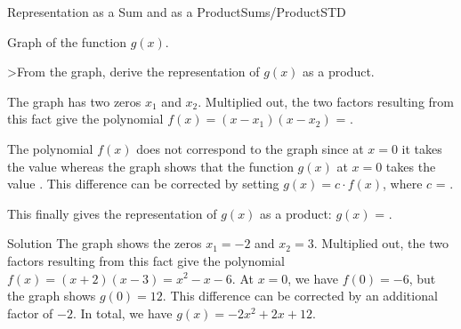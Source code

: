 \begin{MXContent}{Representation as a Sum and as a Product}{Sums/Product}{STD}
\begin{MExercise}
\begin{center}
\par
Graph of the function $g(x)$.
\end{center}
>From the graph, derive the representation of $g(x)$ as a product.

\begin{MExerciseItems}
\item{The graph has two zeros $x_1$ and $x_2$. Multiplied out, the two factors resulting from this fact give the polynomial 
$f(x)=(x-x_1)(x-x_2)$ = .}
\item{The polynomial $f(x)$ does not correspond to the graph since at $x=0$ it takes the value 
 whereas the graph shows that the function $g(x)$ at $x=0$ takes the value 
. This difference can be corrected by setting $g(x)=c\cdot f(x)$, where 
$c$ = .}
\item{This finally gives the representation of $g(x)$ as a product: $g(x)$ = .}
\end{MExerciseItems}
\begin{MHint}{Solution}
The graph shows the zeros $x_1=-2$ and $x_2=3$. Multiplied out, the two factors resulting from this fact give the polynomial
$f(x)=(x+2)(x-3)=x^2-x-6$. At $x=0$, we have $f(0)=-6$, but the graph shows $g(0)=12$. 
This difference can be corrected by an additional factor of $-2$. In total, we have $g(x)=-2x^2+2x+12$.
\end{MHint}
\end{MExercise}



\end{MXContent}
